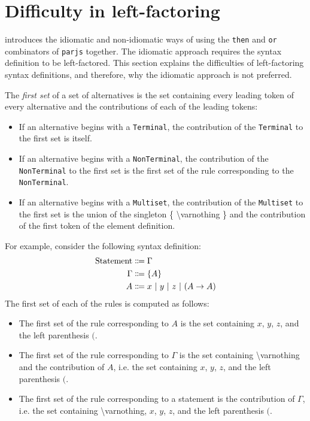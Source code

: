 \section{Difficulty in left-factoring}
\label{syntax:factorisation}
 introduces the idiomatic and non-idiomatic ways of using the \lstinline{then} and \lstinline{or} combinators of \lstinline{parjs} together. The idiomatic approach requires the syntax definition to be left-factored. This section explains the difficulties of left-factoring syntax definitions, and therefore, why the idiomatic approach is not preferred.

\begin{definition}
    The \textit{first set} of a set of alternatives is the set containing every leading token of every alternative and the contributions of each of the leading tokens:
    \begin{itemize}
        \item If an alternative begins with a \lstinline{Terminal}, the contribution of the \lstinline{Terminal} to the first set is itself.
        \item If an alternative begins with a \lstinline{NonTerminal}, the contribution of the \lstinline{NonTerminal} to the first set is the first set of the rule corresponding to the \lstinline{NonTerminal}.
        \item If an alternative begins with a \lstinline{Multiset}, the contribution of the \lstinline{Multiset} to the first set is the union of the singleton \{ \textbackslash varnothing \} and the contribution of the first token of the element definition.
    \end{itemize}
\end{definition}

For example, consider the following syntax definition:
\begin{align*}
    \text{Statement} &\Coloneqq \Gamma \\
    \Gamma &\Coloneqq \{ A \} \\
    A &\Coloneqq x \ |\  y \ |\  z \ |\  (A \to A)
\end{align*}
The first set of each of the rules is computed as follows:
\begin{itemize}
    \item The first set of the rule corresponding to $A$ is the set containing $x$, $y$, $z$, and the left parenthesis $($.
    \item The first set of the rule corresponding to $\Gamma$ is the set containing \textbackslash varnothing and the contribution of $A$, i.e. the set containing $x$, $y$, $z$, and the left parenthesis $($.
    \item The first set of the rule corresponding to a statement is the contribution of $\Gamma$, i.e. the set containing \textbackslash varnothing, $x$, $y$, $z$, and the left parenthesis $($.
\end{itemize}

